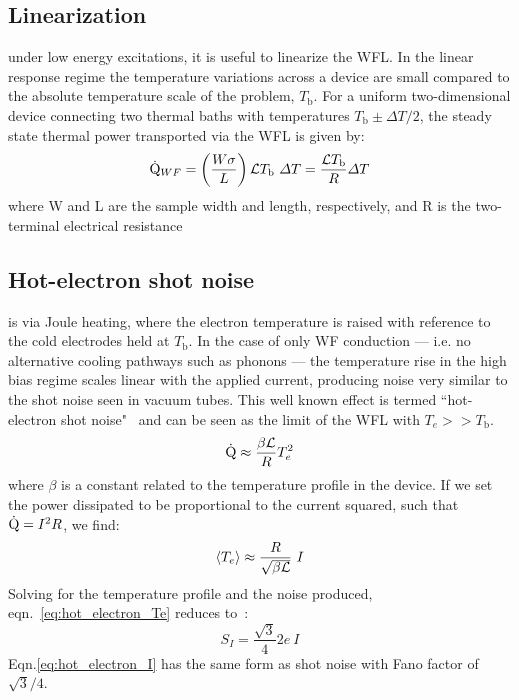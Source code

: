 \subsection{Linearization}
 under low energy excitations, it is useful to linearize the WFL. In the linear response regime the temperature variations across a device are small compared to the absolute temperature scale of the problem, $T_\mathrm{b}$. For a uniform two-dimensional device connecting two thermal baths with temperatures $T_\mathrm{b} \pm\Delta T/2$, the steady state thermal power transported via the WFL is given by:
\begin{equation}\label{eq:QWF}
\dot{\mathrm{Q}}_{WF} = \left(\frac{W\sigma}{L}\right)\mathcal{L} T_\mathrm{b}~\Delta T = \frac{\mathcal{L} T_\mathrm{b}}{R}\Delta T
\end{equation}
where W and L are the sample width and length, respectively, and R is the two-terminal electrical resistance
\subsection{Hot-electron shot noise}
 is via Joule heating, where the electron temperature is raised with reference to the cold electrodes held at $T_\mathrm{b}$. In the case of only WF conduction --- i.e. no alternative cooling pathways such as phonons --- the temperature rise in the high bias regime scales linear with the applied current, producing noise very similar to the shot noise seen in vacuum tubes. This well known effect is termed ``hot-electron shot noise"~\cite{steinbach_observation_1996, blanter_shot_2000, de_jong_semiclassical_1996} and can be seen as the limit of the WFL with $T_e >> T_\mathrm{b}$.
\begin{equation}\label{eq:hot_electron_Q}
\dot{\mathrm{Q}} \approx \frac{\beta\mathcal{L}}{R}T_e^2
\end{equation}
where $\beta$ is a constant related to the temperature profile in the device. If we set the power dissipated to be proportional to the current squared, such that $\dot{\mathrm{Q}} = I^2R$, we find:
\begin{equation}\label{eq:hot_electron_Te}
\langle T_e\rangle \approx \frac{R}{\sqrt{\beta\mathcal{L}}}~I
\end{equation}
Solving for the temperature profile and the noise produced, eqn.~\ref{eq:hot_electron_Te} reduces to~\cite{steinbach_observation_1996}:
\begin{equation}\label{eq:hot_electron_I}
S_I = \frac{\sqrt{3}}{4}2e~I
\end{equation}
Eqn.\ref{eq:hot_electron_I} has the same form as shot noise with Fano factor of $\sqrt{3}/4$.

